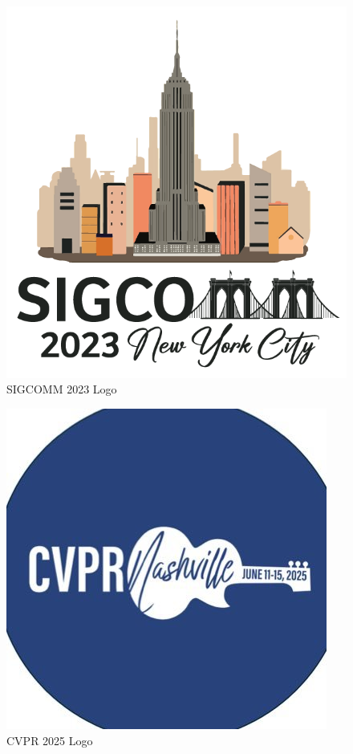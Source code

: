 \documentclass[sigconf, 10pt]{acmart}
\begin{document}
\begin{figure}[h]
	\centering
	\includegraphics[width=\columnwidth]{./appendix/sigcomm23-logo.png}
	\caption{SIGCOMM 2023 Logo}
	\label{fig:sigcomm23logo}
\end{figure}

\begin{figure}[h]
	\centering
	\includegraphics[width=\columnwidth]{./appendix/cvpr25-logo.jpg}
	\caption{CVPR 2025 Logo}
	\label{fig:cvpr25logo}
\end{figure}
\end{document}
